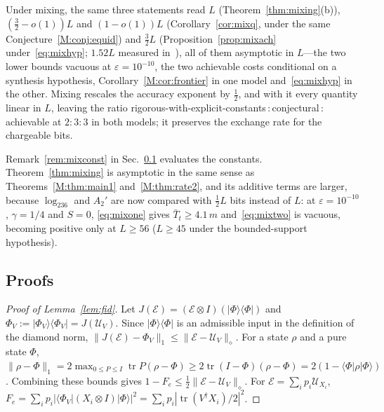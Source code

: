 \documentclass[aps,prx,twocolumn,superscriptaddress,nofootinbib,longbibliography]{revtex4-2}
\theoremstyle{plain}
\theoremstyle{definition}
\theoremstyle{remark}
\newcommand{\tr}{\operatorname{tr}}
\begin{document}
Under mixing, the same three statements read $L$ (Theorem~\ref{thm:mixing}(b)), $(\tfrac32-o(1))L$ and $(1-o(1))L$ (Corollary~\ref{cor:mixq}, under the same Conjecture~\ref{M:conj:equid}) and $\tfrac32L$ (Proposition~\ref{prop:mixach} under~\eqref{eq:mixhyp}; $1.52L$ measured in~\cite{KLMPP}), all of them asymptotic in $L$---the two lower bounds vacuous at $\varepsilon=10^{-10}$, the two achievable costs conditional on a synthesis hypothesis, Corollary~\ref{M:cor:frontier} in one model and~\eqref{eq:mixhyp} in the other. Mixing rescales the accuracy exponent by $\tfrac12$, and with it every quantity linear in $L$, leaving the ratio rigorous-with-explicit-constants\,:\,conjectural\,:\,achievable at $2:3:3$ in both models; it preserves the exchange rate for the chargeable bits.

Remark~\ref{rem:mixconst} in Sec.~\ref{app:mixing} evaluates the constants. Theorem~\ref{thm:mixing} is asymptotic in the same sense as Theorems~\ref{M:thm:main1} and~\ref{M:thm:rate2}, and its additive terms are larger, because $\log_236$ and $A_2'$ are now compared with $\tfrac12L$ bits instead of $L$: at $\varepsilon=10^{-10}$, $\gamma=1/4$ and $S=0$, \eqref{eq:mixone} gives $\bar T_t\ge4.1\,m$ and~\eqref{eq:mixtwo} is vacuous, becoming positive only at $L\ge56$ ($L\ge45$ under the bounded-support hypothesis).

\subsection{Proofs}\label{app:mixing}


\begin{proof}[Proof of Lemma~\ref{lem:fid}]
Let $J(\mathcal E)=(\mathcal E\otimes I)(|\Phi\rangle\langle\Phi|)$ and $\Phi_V:=|\Phi_V\rangle\langle\Phi_V|=J(\mathcal U_V)$. Since $|\Phi\rangle\langle\Phi|$ is an admissible input in the definition of the diamond norm, $\|J(\mathcal E)-\Phi_V\|_1\le\|\mathcal E-\mathcal U_V\|_\diamond$. For a state $\rho$ and a pure state $\Phi$, $\|\rho-\Phi\|_1=2\max_{0\le P\le I}\tr P(\rho-\Phi)\ge2\tr(I-\Phi)(\rho-\Phi)=2(1-\langle\Phi|\rho|\Phi\rangle)$. Combining these bounds gives $1-F_e\le\tfrac12\|\mathcal E-\mathcal U_V\|_\diamond$. For $\mathcal E=\sum_ip_i\mathcal U_{X_i}$, $F_e=\sum_ip_i|\langle\Phi_V|(X_i\otimes I)|\Phi\rangle|^2=\sum_ip_i|\tr(V^\dagger X_i)/2|^2$.
\end{proof}
\end{document}
